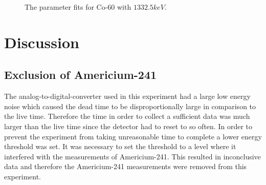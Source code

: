 \documentclass[12pt]{report}
\begin{document}
\begin{figure}[ht]
    \centering
    
    
    
    \caption{The parameter fits for Co-60 with $1332.5keV$.}
    \label{figure:co6013325}
\end{figure}

\chapter{Discussion}
\section{Exclusion of Americium-241}
The analog-to-digital-converter used in this experiment had a large low energy noise which caused the dead time to be disproportionally large in comparison to the live time. Therefore the time in order to collect a sufficient data was much larger than the live time since the detector had to reset to so often. In order to prevent the experiment from taking unreasonable time to complete a lower energy threshold was set. It was necessary to set the threshold to a level where it interfered with the measurements of Americium-241. This resulted in inconclusive data and therefore the Americium-241 measurements were removed from this experiment.
\end{document}
